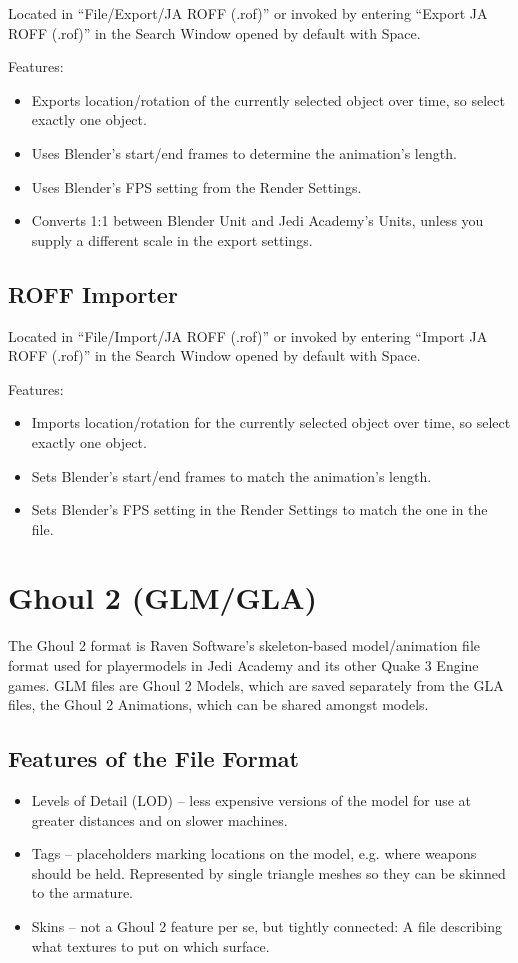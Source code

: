 \documentclass[a4paper,10pt]{article}
\begin{document}
 Located in ``File/Export/JA ROFF (.rof)'' or invoked by entering ``Export JA ROFF (.rof)'' in the Search Window
 opened by default with Space.
 
 Features:
 \begin{itemize}
  \item Exports location/rotation of the currently selected object over time, so select exactly one object.
  \item Uses Blender's start/end frames to determine the animation's length.
  \item Uses Blender's FPS setting from the Render Settings.
  \item Converts 1:1 between Blender Unit and Jedi Academy's Units, unless you supply a different scale in
  the export settings.
 \end{itemize}

 \subsection{ROFF Importer}
 
 Located in ``File/Import/JA ROFF (.rof)'' or invoked by entering ``Import JA ROFF (.rof)'' in the Search Window
 opened by default with Space.
 
 Features:
 \begin{itemize}
  \item Imports location/rotation for the currently selected object over time, so select exactly one object.
  \item Sets Blender's start/end frames to match the animation's length.
  \item Sets Blender's FPS setting in the Render Settings to match the one in the file.
 \end{itemize}
 
 
 \section{Ghoul 2 (GLM/GLA)}
 
 The Ghoul 2 format is Raven Software's skeleton-based model/animation file format used for playermodels in
 Jedi Academy and its other Quake 3 Engine games. GLM files are Ghoul 2 Models, which are saved separately from
 the GLA files, the Ghoul 2 Animations, which can be shared amongst models.
 
 
 \subsection{Features of the File Format}
 \begin{itemize}
  \item Levels of Detail (LOD) -- less expensive versions of the model for use at greater distances and on
  slower machines.
  \item Tags -- placeholders marking locations on the model, e.g. where weapons should be held. Represented by
  single triangle meshes so they can be skinned to the armature.
  \item Skins -- not a Ghoul 2 feature per se, but tightly connected: A file describing what textures to put on
  which surface.
 \end{itemize}
 
\end{document}
